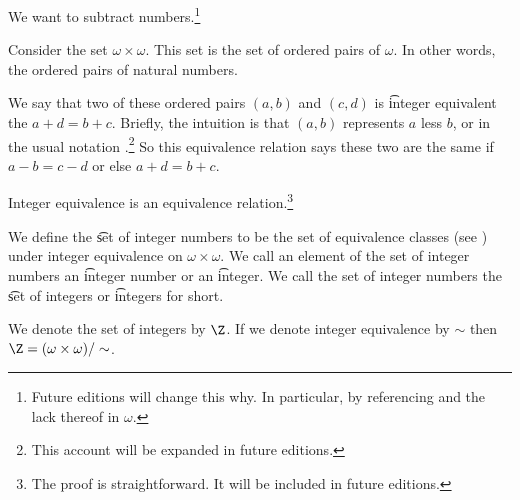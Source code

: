

We want to subtract numbers.\footnote{Future editions will change this why. In particular, by referencing  and the lack thereof in $\omega$.}


Consider the set $\omega \times \omega$.
This set is the set of ordered pairs of $\omega$.
In other words, the ordered pairs of natural numbers.

We say that two of these ordered pairs $(a, b)$ and $(c, d)$ is \t{integer equivalent} the $a + d = b +c$.
Briefly, the intuition is that $(a, b)$ represents $a$ less $b$, or in the usual notation .\footnote{This account will be expanded in future editions.}
So this equivalence relation says these two are the same if $a - b = c - d$ or else $a + d = b + c$.

\begin{proposition}
	Integer equivalence is an equivalence relation.\footnote{The proof is straightforward. It will be included in future editions.}
\end{proposition}

We define the \t{set of integer numbers} to be the set of equivalence classes (see ) under integer equivalence on $\omega \times \omega$.
We call an element of the set of integer numbers an \t{integer number} or an \t{integer}.
We call the set of integer numbers the \t{set of integers} or \t{integers} for short.


We denote the set of integers by $\Z$.
If we denote integer equivalence by $\sim$ then $\Z = (\omega \times \omega)/\sim$.

